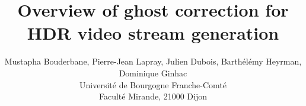 \title{Overview of ghost correction for HDR video stream generation}

\author{Mustapha Bouderbane, Pierre-Jean Lapray, Julien Dubois, Barth\'el\'emy Heyrman, Dominique Ginhac\\
Universit\'e de Bourgogne Franche-Comt\'e\\
Facult\'e Mirande, 21000 Dijon\\}
